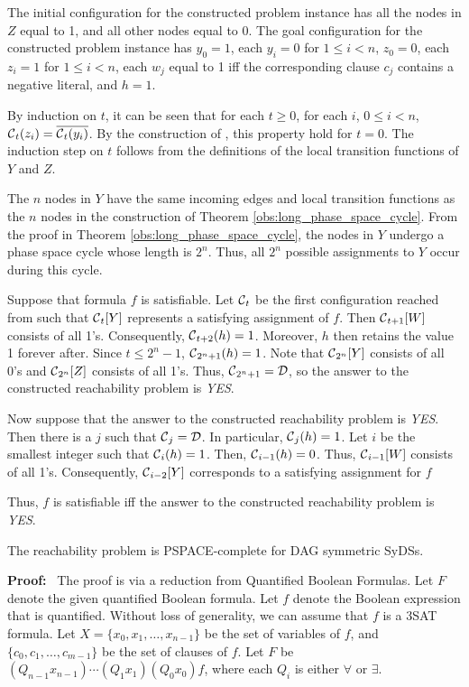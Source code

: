 The initial configuration \calc{} for the constructed problem instance
 has all the nodes in $Z$ equal to 1, and all other nodes equal to 0.
The goal configuration \cald{} for the constructed problem instance 
has $y_0 = 1$,  each  $y_i= 0$ for $1 \leq i <n$, $z_0 = 0$,  each  $z_i= 1$ for $1 \leq i <n$,
each $w_j$ equal to 1 iff the corresponding clause $c_j$ contains a negative literal,
and $h = 1$.

By induction on $t$, it can be seen that for each $t \geq 0$,
for each $i$, $0 \leq i < n$, 
$\mbox{$\mathcal{C}$}_t(z_i) = \overline{\mbox{$\mathcal{C}$}_t(y_i)}$.
By the construction of \calc{}, this property hold for $t = 0$.
The induction step on $t$ follows from the definitions of the local transition functions of $Y$ and $Z$.

The $n$ nodes in $Y$ have the same incoming edges and local transition functions 
as the $n$ nodes in the construction of Theorem \ref{obs:long_phase_space_cycle}.
From the proof in Theorem \ref{obs:long_phase_space_cycle}, 
the nodes in $Y$ undergo a phase space cycle whose length is $2^n$.
Thus, all $2^n$ possible assignments to $Y$ occur during this cycle.

Suppose that formula $f$ is satisfiable. 
Let $\mbox{$\mathcal{C}$}_t$ be the first configuration reached from \calc{} such that
$\mbox{$\mathcal{C}$}_t[Y]$ represents a satisfying assignment of $f$.
Then $\mbox{$\mathcal{C}$}_{t+1}[W]$ consists of all 1's.
Consequently, $\mbox{$\mathcal{C}$}_{t+2}(h) = 1$. 
Moreover, $h$ then retains the value 1 forever after.
Since $t \leq 2^n-1$, $\mbox{$\mathcal{C}$}_{2^n+1}(h) = 1$.
Note that $\mbox{$\mathcal{C}$}_{2^n}[Y]$ consists of all 0's and $\mbox{$\mathcal{C}$}_{2^n}[Z]$ consists of all 1's.
Thus, $\mbox{$\mathcal{C}$}_{2^n+1} = \mbox{$\mathcal{D}$}$, so the answer to the constructed reachability problem is {\em YES}.

Now suppose that the answer to the constructed reachability problem is {\em YES}.
Then there is a $j$ such that $\mbox{$\mathcal{C}$}_j = \mbox{$\mathcal{D}$}$. 
In particular, $\mbox{$\mathcal{C}$}_j(h) = 1$.
Let $i$ be the smallest integer such that $\mbox{$\mathcal{C}$}_i(h) = 1$.
Then, $\mbox{$\mathcal{C}$}_{i-1}(h) = 0$.
Thus, $\mbox{$\mathcal{C}$}_{i-1}[W]$ consists of all 1's.
Consequently, $\mbox{$\mathcal{C}$}_{i-2}[Y]$ corresponds to a satisfying assignment for $f$

Thus, $f$ is satisfiable iff the answer to the constructed reachability problem is {\em YES}. 
\QED

\smallskip
\begin{theorem}\label{thm:reachability-PSPACE}
The reachability problem is PSPACE-complete for DAG symmetric SyDSs.
\end{theorem}

\noindent
\textbf{Proof:}~ 
The proof is via a reduction from Quantified Boolean Formulas.
Let $F$ denote the given quantified Boolean formula.
Let $f$ denote the Boolean expression that is quantified.
Without loss of generality, we can assume that $f$ is a 3SAT formula.
Let $X = \{x_0, x_1, \dots , x_{n-1}\}$ be the set of variables of $f$,
and $\{c_0, c_1, \dots , c_{m-1}\}$ be the set of clauses of $f$.
Let $F$ be $(Q_ {n-1} x_{n-1}) \cdots (Q_1 x_1) (Q_0 x_0) f$,
where each $Q_i$ is either $\forall$ or $\exists$.       

